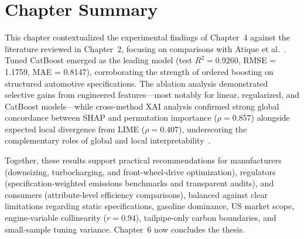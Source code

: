 \section{Chapter Summary}

This chapter contextualized the experimental findings of Chapter~4 against the literature reviewed in Chapter~2, focusing on comparisons with Atique et al.~\cite{atique2026explainable}. Tuned CatBoost emerged as the leading model (test \(R^2 = 0.9260\), RMSE = 1.1759, MAE = 0.8147), corroborating the strength of ordered boosting on structured automotive specifications. The ablation analysis demonstrated selective gains from engineered features---most notably for linear, regularized, and CatBoost models---while cross-method XAI analysis confirmed strong global concordance between SHAP and permutation importance (\(\rho = 0.857\)) alongside expected local divergence from LIME (\(\rho = 0.407\)), underscoring the complementary roles of global and local interpretability~\cite{atique2026explainable}.

Together, these results support practical recommendations for manufacturers (downsizing, turbocharging, and front-wheel-drive optimization), regulators (specification-weighted emissions benchmarks and transparent audits), and consumers (attribute-level efficiency comparisons), balanced against clear limitations regarding static specifications, gasoline dominance, US market scope, engine-variable collinearity (\(r = 0.94\)), tailpipe-only carbon boundaries, and small-sample tuning variance. Chapter~6 now concludes the thesis.
